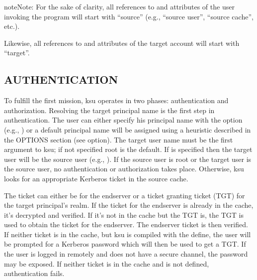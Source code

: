 \documentclass[letterpaper,10pt,english]{sphinxmanual}
\begin{document}
\begin{sphinxadmonition}{note}{Note:}
\sphinxAtStartPar
For the sake of clarity, all references to and attributes of
the user invoking the program will start with “source”
(e.g., “source user”, “source cache”, etc.).

\sphinxAtStartPar
Likewise, all references to and attributes of the target
account will start with “target”.
\end{sphinxadmonition}


\subsection{AUTHENTICATION}
\label{\detokenize{user/user_commands/ksu:authentication}}
\sphinxAtStartPar
To fulfill the first mission, ksu operates in two phases:
authentication and authorization.  Resolving the target principal name
is the first step in authentication.  The user can either specify his
principal name with the  option (e.g., )
or a default principal name will be assigned using a heuristic
described in the OPTIONS section (see  option).  The target user
name must be the first argument to ksu; if not specified root is the
default.  If  is specified then the target user will be the
source user (e.g., ).  If the source user is root or the
target user is the source user, no authentication or authorization
takes place.  Otherwise, ksu looks for an appropriate Kerberos ticket
in the source cache.

\sphinxAtStartPar
The ticket can either be for the end\sphinxhyphen{}server or a ticket granting
ticket (TGT) for the target principal’s realm.  If the ticket for the
end\sphinxhyphen{}server is already in the cache, it’s decrypted and verified.  If
it’s not in the cache but the TGT is, the TGT is used to obtain the
ticket for the end\sphinxhyphen{}server.  The end\sphinxhyphen{}server ticket is then verified.
If neither ticket is in the cache, but ksu is compiled with the
 define, the user will be prompted for a
Kerberos password which will then be used to get a TGT.  If the user
is logged in remotely and does not have a secure channel, the password
may be exposed.  If neither ticket is in the cache and
 is not defined, authentication fails.
\end{document}
